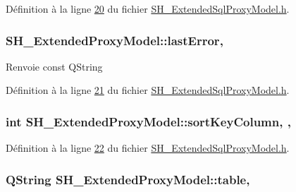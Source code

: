 Définition à la ligne \hyperlink{SH__ExtendedSqlProxyModel_8h_source_l00020}{20} du fichier \hyperlink{SH__ExtendedSqlProxyModel_8h_source}{S\-H\-\_\-\-Extended\-Sql\-Proxy\-Model.\-h}.

\hypertarget{classSH__ExtendedProxyModel_a287d34971582bbe68a7f1f0826165de5}{
\subsubsection[{last\-Error}]{\setlength{\rightskip}{0pt plus 5cm}S\-H\-\_\-\-Extended\-Proxy\-Model\-::last\-Error\hspace{0.3cm}{\ttfamily [read]}, {\ttfamily [inherited]}}}\label{classSH__ExtendedProxyModel_a287d34971582bbe68a7f1f0826165de5}
\begin{DoxyReturn}{Renvoie}
const Q\-String 
\end{DoxyReturn}


Définition à la ligne \hyperlink{SH__ExtendedSqlProxyModel_8h_source_l00021}{21} du fichier \hyperlink{SH__ExtendedSqlProxyModel_8h_source}{S\-H\-\_\-\-Extended\-Sql\-Proxy\-Model.\-h}.

\hypertarget{classSH__ExtendedProxyModel_a47e2d0b99b84fb066438db667dd1ad26}{
\subsubsection[{sort\-Key\-Column}]{\setlength{\rightskip}{0pt plus 5cm}int S\-H\-\_\-\-Extended\-Proxy\-Model\-::sort\-Key\-Column\hspace{0.3cm}{\ttfamily [read]}, {\ttfamily [write]}, {\ttfamily [inherited]}}}\label{classSH__ExtendedProxyModel_a47e2d0b99b84fb066438db667dd1ad26}


Définition à la ligne \hyperlink{SH__ExtendedSqlProxyModel_8h_source_l00022}{22} du fichier \hyperlink{SH__ExtendedSqlProxyModel_8h_source}{S\-H\-\_\-\-Extended\-Sql\-Proxy\-Model.\-h}.

\hypertarget{classSH__ExtendedProxyModel_a7eef4557a77444e9ce5c24c180392bfa}{
\subsubsection[{table}]{\setlength{\rightskip}{0pt plus 5cm}Q\-String S\-H\-\_\-\-Extended\-Proxy\-Model\-::table\hspace{0.3cm}{\ttfamily [read]}, {\ttfamily [inherited]}}}\label{classSH__ExtendedProxyModel_a7eef4557a77444e9ce5c24c180392bfa}


